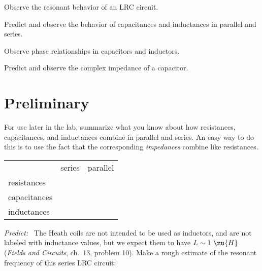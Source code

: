 \label{lab:ac}

\apparatus
{}

\begin{goals}

\item[] Observe the resonant behavior of an LRC circuit.

\item[] Predict and observe the behavior of capacitances and inductances in parallel and series.

\item[] Observe phase relationships in capacitors and inductors.

\item[] Predict and observe the complex impedance of a capacitor.
\end{goals}

\section*{Preliminary}

For use later in the lab, summarize what you know about how resistances, capacitances, and inductances
combine in parallel and series. An easy way to do this is to use the fact that the corresponding
\emph{impedances} combine like resistances.

\begin{tabular}{lp{30mm}p{30mm}}
          & series & parallel \\
resistances & & \\
capacitances & & \\
inductances & & 
\end{tabular}


\newcommand{\predict}{\emph{Predict:\ }}
\newcommand{\predictnocolon}{\emph{Predict\ }}
\newcommand{\obs}{\emph{Observe:\ }}
\newcommand{\obsnocolon}{\emph{Observe\ }}
\newcommand{\explain}{\emph{Explain\ }}
\newcommand{\measure}{\emph{Measure\ }}


\predict
The Heath coils are not intended to be used as inductors, and are not labeled with inductance values, but we
expect them to have $L\sim1\ \zu{H}$ (\emph{Fields and Circuits}, ch.~13, problem 10). Make a rough estimate of the resonant frequency of this series LRC circuit:

